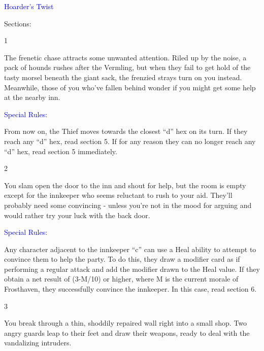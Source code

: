\documentclass[fontsize=11pt]{scrartcl}
\begin{document}
	\BgThispage
	{\myfont\textcolor{Blue}{Hoarder's Twist}}\newline
	\begin{multicols*}{3}
	  \begin{center}
	    {\myfont\textcolor{Sepia}{\LARGE{Sections:}}}
		\end{center}
		\begin{center}
		  {\myfont\large{\textcolor{Sepia}{1}}}
		\end{center}
		\footnotesize{The frenetic chase attracts some unwanted attention. Riled up by the noise, a pack of hounds rushes after the Vermling, but when they fail to get hold of the tasty morsel beneath the giant sack, the frenzied strays turn on you instead. Meanwhile, those of you who’ve fallen behind wonder if you might get some help at the nearby inn.}
		\begin{center}
	    {\myfont\normalsize{\textcolor{Blue}{Special Rules:}}}
		\end{center}
		\footnotesize{From now on, the Thief moves towards the closest “d” hex on its turn. If they reach any “d” hex, read section 5. If for any reason they can no longer reach any “d” hex, read section 5 immediately.}
		\begin{center}
		  {\myfont\large{\textcolor{Sepia}{2}}}
		\end{center}
		\footnotesize{You slam open the door to the inn and shout for help, but the room is empty except for the innkeeper who seems reluctant to rush to your aid. They’ll probably need some convincing - unless you’re not in the mood for arguing and would rather try your luck with the back door. }
		\begin{center}
	    {\myfont\normalsize{\textcolor{Blue}{Special Rules:}}}
		\end{center}
		\footnotesize{Any character adjacent to the innkeeper “c” can use a Heal ability to attempt to convince them to help the party. To do this, they draw a modifier card as if performing a regular attack and add the modifier drawn to the Heal value. If they obtain a net result of (3-M/10) or higher, where M is the current morale of Frosthaven, they successfully convince the innkeeper. In this case, read section 6.}
		\begin{center}
		  {\myfont\large{\textcolor{Sepia}{3}}}
		\end{center}
		\footnotesize{You break through a thin, shoddily repaired wall right into a small shop. Two angry guards leap to their feet and draw their weapons, ready to deal with the vandalizing intruders.}

\end{multicols*}
\end{document}
